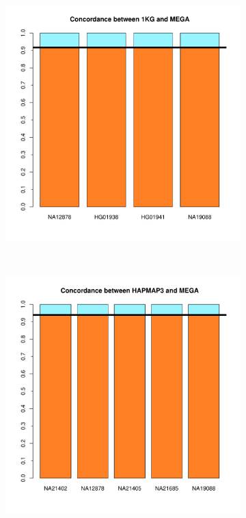 \documentclass[11pt]{report}
\begin{document}
\newpage
\begin{figure}[ht!]
    \centering
    \caption{Comparacion cluster GLOBAL}
    \begin{subfigure}[t]{0.5\textwidth}
        \centering
        \includegraphics[scale=0.55]{Concordance_1KG_MEGA_clusterGLOBAL.pdf}
    \end{subfigure}%
    ~ 
    \begin{subfigure}[t]{0.5\textwidth}
        \centering
        \includegraphics[scale=0.55]{Concordance_HAPMAP_MEGA_clusterGLOBAL.pdf}
    \end{subfigure}
\end{figure}
\end{document}
